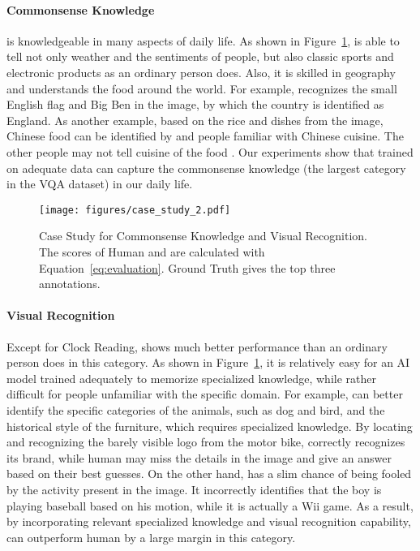 \paragraph{Commonsense Knowledge}
\modelname is knowledgeable in many aspects of daily life. As shown in Figure~\ref{fig:case_study_1}, \modelname is able to tell not only weather and the sentiments of people, but also classic sports and electronic products as an ordinary person does. Also, it is skilled in geography and understands the food around the world. For example, \modelname recognizes the small English flag and Big Ben in the image, by which the country is identified as England. As another example, based on the rice and dishes from the image, Chinese food can be identified by \modelname and people familiar with Chinese cuisine. The other people may not tell cuisine of the food .
Our experiments show that \modelname trained on adequate data can capture the commonsense knowledge (the largest category in the VQA dataset) in our daily life.

\begin{figure}[t] \centering
    \texttt{[image: figures/case\_study\_2.pdf]}
    \caption{Case Study for Commonsense Knowledge and Visual Recognition. The scores of Human and \modelname are calculated with Equation~\ref{eq:evaluation}. Ground Truth gives the top three annotations.}
    \label{fig:case_study_1}
\end{figure}

\paragraph{Visual Recognition}
Except for Clock Reading, \modelname shows much better performance than an ordinary person does in this category. As shown in Figure~\ref{fig:case_study_1}, it is relatively easy for an AI model trained adequately to memorize specialized knowledge, while rather difficult for people unfamiliar with the specific domain. For example, \modelname can better identify the specific categories of the animals, such as dog and bird, and the historical style of the furniture, which requires specialized knowledge. By locating and recognizing the barely visible logo from the motor bike, \modelname correctly recognizes its brand, while human may miss the details in the image and give an answer based on their best guesses. On the other hand, \modelname has a slim chance of being fooled by the activity present in the image. It incorrectly identifies that the boy is playing baseball based on his motion, while it is actually a Wii game. As a result, by incorporating relevant specialized knowledge and visual recognition capability, \modelname can outperform human by a large margin in this category.

